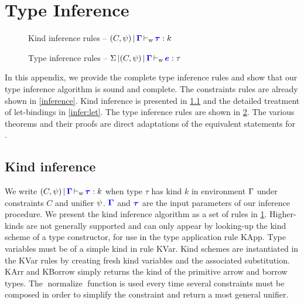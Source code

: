 \section{Type Inference}
\label{appendix:infer}

\begin{figure*}[tbp]
  \centering
  
  \caption{Kind inference rules -- $(C,\mathrm{\psi}) \operatorname{|} {\textcolor{blue}{\bm{\Gamma}}} \operatorname{\vdash_w} {\textcolor{blue}{\bm{\tau}}} : k$}
  \label{rules:kinding}
\end{figure*}

\begin{figure*}[!tbp]
  
  \caption{Type inference rules --
    $\Sigma \operatorname{|} (C,\psi) \operatorname{|} {\textcolor{blue}{\bm{\Gamma}}} \operatorname{\vdash_w} {\textcolor{blue}{\bm{e}}} : \tau$ }
  \label{rules:typing:full}
\end{figure*}

In this appendix, we provide the complete type inference rules
and show that our type inference algorithm is sound and complete.
The constraints rules are already shown in \cref{inference}.
Kind inference is presented in \cref{rules:kinding:full}
and the detailed treatment of let-bindings in
\cref{infer:let}.
The type inference rules are shown in \cref{rules:typing:full}.
The various theorems and their proofs are direct adaptations
of the equivalent statements for \hmx \citep{sulzmann1997proofs}.

\subsection{Kind inference}
\label{rules:kinding:full}

We write $(C,\mathrm{\psi}) \operatorname{|} {\textcolor{blue}{\bm{\Gamma}}} \operatorname{\vdash_w} {\textcolor{blue}{\bm{\tau}}} : k$ when type $\tau$ has kind $k$
in environment $\Gamma$ under constraints $C$ and unifier $\mathrm{\psi}$.
$\textcolor{blue}{\bm{\Gamma}}$ and $\textcolor{blue}{\bm{\tau}}$ are the input parameters of
our inference procedure.
We present the kind inference algorithm as a set of rules in
\cref{rules:kinding}.
Higher-kinds are not generally supported
and can only appear by looking-up the kind scheme of a type constructor,
for use in the type application rule {\sc KApp}.
Type variables must be of a simple kind in rule {\sc KVar}.
Kind schemes are instantiated in the {\sc KVar} rules by creating
fresh kind variables and the associated substitution.
{\sc KArr} and {\sc KBorrow} simply returns the kind of the primitive
arrow and borrow types.
The $\operatorname{normalize}$ function is used every time several constraints
must be composed in order to simplify the constraint and return a most general
unifier.


